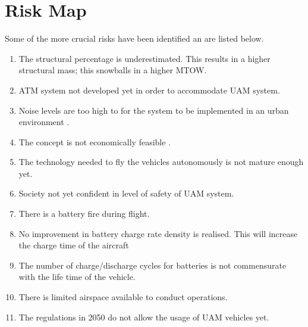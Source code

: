 


\section{Risk Map}
Some of the more crucial risks have been identified an are listed below. 
\begin{enumerate}[nolistsep]
    \item The structural percentage is underestimated. This results in a higher structural mass; this snowballs in a higher MTOW.
    \item ATM system not developed yet in order to accommodate UAM system.
    \item Noise levels are too high to for the system to be implemented in an urban environment .
    \item The concept is not economically feasible .
    \item The technology needed to fly the vehicles autonomously is not mature enough yet.
    \item Society not yet confident in level of safety of UAM system.
    \item There is a battery fire during flight.
    \item No improvement in battery charge rate density is realised. This will increase the charge time of the aircraft
    \item The number of charge/discharge cycles for batteries is not commensurate with the life time of the vehicle.
    \item There is limited airspace available to conduct operations. 
    \item The regulations in 2050 do not allow the usage of UAM vehicles yet.
\end{enumerate}

